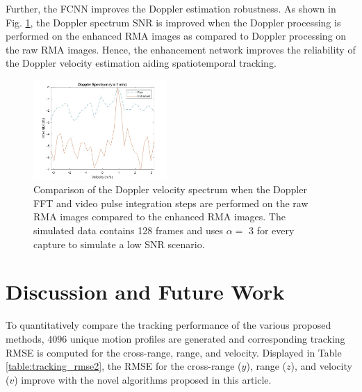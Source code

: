 \documentclass[10pt,journal,final]{IEEEtran}
\begin{document}
Further, the FCNN improves the Doppler estimation robustness. 
As shown in Fig. \ref{fig:doppler_snr}, the Doppler spectrum SNR is improved when the Doppler processing is performed on the enhanced RMA images as compared to Doppler processing on the raw RMA images.
Hence, the enhancement network improves the reliability of the Doppler velocity estimation aiding spatiotemporal tracking.



\begin{figure}[h]
	\centering
	\includegraphics[width=2in]{dopplerSNR.jpg}
	\caption{Comparison of the Doppler velocity spectrum when the Doppler FFT and video pulse integration steps are performed on the raw RMA images compared to the enhanced RMA images. The simulated data contains 128 frames and uses $\alpha = $ 3 for every capture to simulate a low SNR scenario.}
	\label{fig:doppler_snr}
\end{figure}




\section{Discussion and Future Work}
\label{sec:discussion}

To quantitatively compare the tracking performance of the various proposed methods, $4096$ unique motion profiles are generated and corresponding tracking RMSE is computed for the cross-range, range, and velocity. 
Displayed in Table \ref{table:tracking_rmse2}, the RMSE for the cross-range ($y$), range ($z$), and velocity ($v$) improve with the novel algorithms proposed in this article. 
\end{document}
